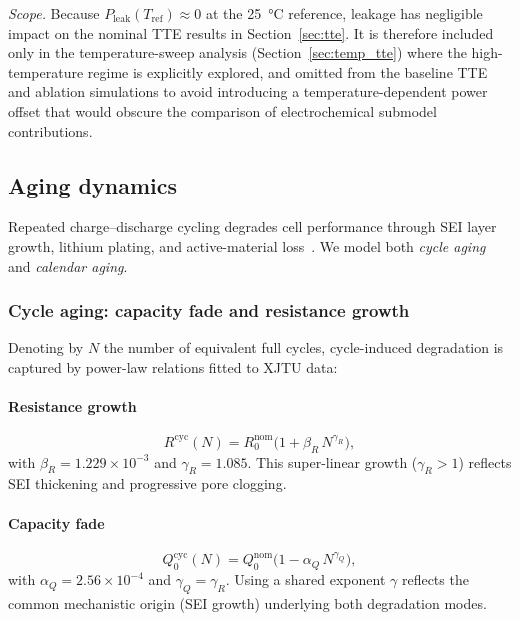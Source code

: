 \documentclass[5p,times,number]{elsarticle}
\newcommand{\secref}[1]{\hyperref[#1]{\textup{Section~\ref*{#1}}}}
\def\secref#1{Section~\ref{#1}}
\begin{document}
\emph{Scope.}
Because $P_{\mathrm{leak}}(T_{\mathrm{ref}}) \approx 0$ at the \SI{25}{\degreeCelsius} reference, leakage has negligible impact on the nominal TTE results in \secref{sec:tte}.
It is therefore included only in the temperature-sweep analysis (\secref{sec:temp_tte}) where the high-temperature regime is explicitly explored, and omitted from the baseline TTE and ablation simulations to avoid introducing a temperature-dependent power offset that would obscure the comparison of electrochemical submodel contributions.

\subsection{Aging dynamics}\label{sec:aging}
Repeated charge--discharge cycling degrades cell performance through SEI layer growth, lithium plating, and active-material loss~\cite{Vetter2005}.
We model both \emph{cycle aging} and \emph{calendar aging}.
\subsubsection{Cycle aging: capacity fade and resistance growth}
Denoting by $N$ the number of equivalent full cycles, cycle-induced degradation is captured by power-law relations fitted to XJTU data:
\paragraph{Resistance growth}
\begin{equation}\label{eq:Raging}
R^{\mathrm{cyc}}(N) = R_0^{\mathrm{nom}}\bigl(1 + \beta_R\, N^{\gamma_R}\bigr),
\end{equation}
with $\beta_R = 1.229 \times 10^{-3}$ and $\gamma_R = 1.085$.  This super-linear growth ($\gamma_R > 1$) reflects SEI thickening and progressive pore clogging.
\paragraph{Capacity fade}
\begin{equation}\label{eq:Qaging}
Q_0^{\mathrm{cyc}}(N) = Q_0^{\mathrm{nom}}\bigl(1 - \alpha_Q\, N^{\gamma_Q}\bigr),
\end{equation}
with $\alpha_Q = 2.56 \times 10^{-4}$ and $\gamma_Q = \gamma_R$.  Using a shared exponent $\gamma$ reflects the common mechanistic origin (SEI growth) underlying both degradation modes.
\end{document}
